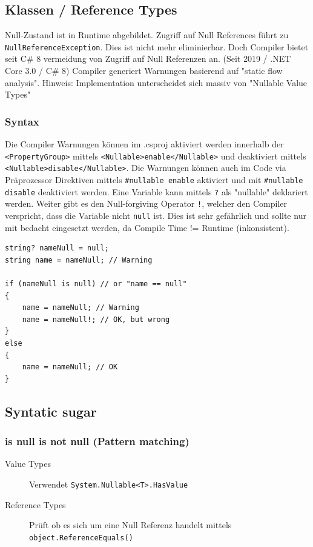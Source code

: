 \documentclass[
a4paper,
oneside,
10pt,
fleqn,
headsepline,
toc=listofnumbered, 
bibliography=totocnumbered]{scrartcl}
\begin{document}
\subsection{Klassen / Reference Types}
Null-Zustand ist in Runtime abgebildet. Zugriff auf Null References führt zu \lstinline|NullReferenceException|. Dies ist nicht mehr eliminierbar. Doch Compiler bietet seit C\# 8 vermeidung von Zugriff auf Null Referenzen an. (Seit 2019 / .NET Core 3.0 / C\# 8)
Compiler generiert Warnungen basierend auf "static flow analysis".
\newline\newline
Hinweis: Implementation unterscheidet sich massiv von "Nullable Value Types"
\subsubsection{Syntax}
Die Compiler Warnungen können im .csproj aktiviert werden innerhalb der \lstinline|<PropertyGroup>| mittels \lstinline|<Nullable>enable</Nullable>| und deaktiviert mittels \lstinline|<Nullable>disable</Nullable>|. Die Warnungen können auch im Code via Präprozessor Direktiven mittels \lstinline|#nullable enable| aktiviert und mit \lstinline|#nullable disable|  deaktiviert werden.
\newline\newline
Eine Variable kann mittels \lstinline|?| als "nullable" deklariert werden. Weiter gibt es den Null-forgiving Operator \lstinline|!|, welcher den Compiler verspricht, dass die Variable nicht \lstinline|null| ist. Dies ist sehr gefährlich und sollte nur mit bedacht eingesetzt werden, da Compile Time != Runtime (inkonsistent).
\begin{lstlisting}
string? nameNull = null;
string name = nameNull; // Warning

if (nameNull is null) // or "name == null"
{
	name = nameNull; // Warning
	name = nameNull!; // OK, but wrong
}
else
{
	name = nameNull; // OK
}
\end{lstlisting}

\subsection{Syntatic sugar}
\subsubsection{is null \/ is not null (Pattern matching)}
\begin{description}
	\item[Value Types] Verwendet \lstinline|System.Nullable<T>.HasValue|
	\item[Reference Types] Prüft ob es sich um eine Null Referenz handelt mittels \lstinline|object.ReferenceEquals()|
\end{description}
\end{document}
